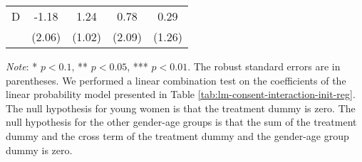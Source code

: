 \documentclass[12pt, a4paper]{article}
\begin{document}
\begin{table}[H]
\begin{threeparttable}
\begin{tabular}[t]{lcccc}
\hspace{1em}D & -1.18 & 1.24 & 0.78 & 0.29\\
\hspace{1em} & (2.06) & (1.02) & (2.09) & (1.26)\\
\bottomrule
\end{tabular}
\begin{tablenotes}
\item \emph{Note}: * $p < 0.1$, ** $p < 0.05$, *** $p < 0.01$. The robust standard errors are in parentheses. We performed a linear combination test on the coefficients of the linear probability model presented in Table \ref{tab:lm-consent-interaction-init-reg}. The null hypothesis for young women is that the treatment dummy is zero. The null hypothesis for the other gender-age groups is that the sum of the treatment dummy and the cross term of the treatment dummy and the gender-age group dummy is zero.
\end{tablenotes}
\end{threeparttable}
\end{table}
\end{document}
